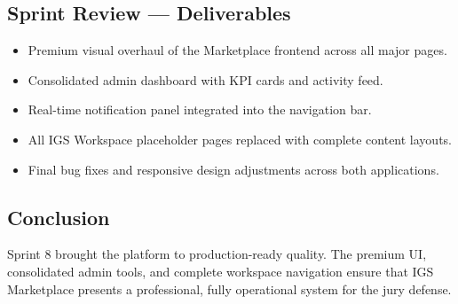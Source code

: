 \subsection{Sprint Review --- Deliverables}

\begin{itemize}
  \item Premium visual overhaul of the Marketplace frontend across all major pages.
  \item Consolidated admin dashboard with KPI cards and activity feed.
  \item Real-time notification panel integrated into the navigation bar.
  \item All IGS Workspace placeholder pages replaced with complete content layouts.
  \item Final bug fixes and responsive design adjustments across both applications.
\end{itemize}

\subsection*{Conclusion}
Sprint 8 brought the platform to production-ready quality. The premium UI, consolidated admin tools, and complete workspace navigation ensure that IGS Marketplace presents a professional, fully operational system for the jury defense.
